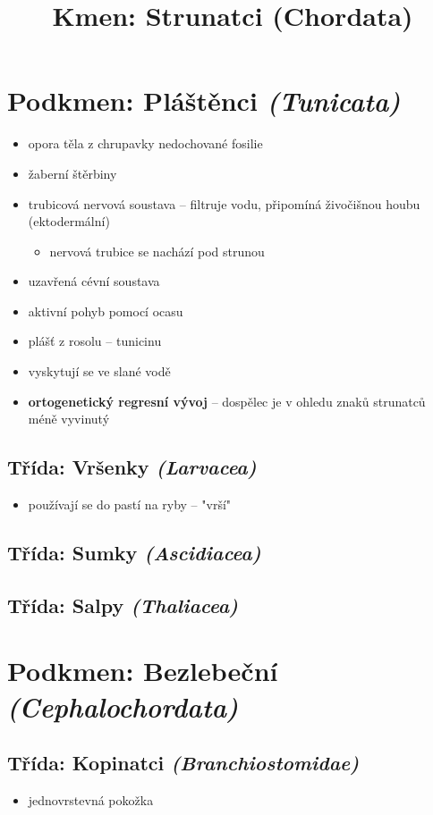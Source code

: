 \title{Kmen: Strunatci (Chordata)}


\section{Podkmen: Pláštěnci \textit{(Tunicata)}}
\begin{itemize}
\item opora těla z chrupavky \ra nedochované fosilie
\item žaberní štěrbiny
\item trubicová nervová soustava -- filtruje vodu, připomíná živočišnou houbu (ektodermální)
\begin{itemize}
\item nervová trubice  se nachází pod strunou
\end{itemize}
\item uzavřená cévní soustava
\item aktivní pohyb pomocí ocasu
\item plášť z rosolu -- tunicinu
\item vyskytují se ve slané vodě
\item \textbf{ortogenetický regresní vývoj} -- dospělec je v ohledu znaků strunatců méně vyvinutý
\end{itemize}

\subsection{Třída: Vršenky \textit{(Larvacea)}}
\begin{itemize}
\item používají se do pastí na ryby -- "vrší"
\end{itemize}
\subsection{Třída: Sumky \textit{(Ascidiacea)}}
\subsection{Třída: Salpy \textit{(Thaliacea)}}


\section{Podkmen: Bezlebeční \textit{(Cephalochordata)}}
\subsection{Třída: Kopinatci \textit{(Branchiostomidae)}}
\begin{itemize}
\item jednovrstevná pokožka
\end{itemize}


